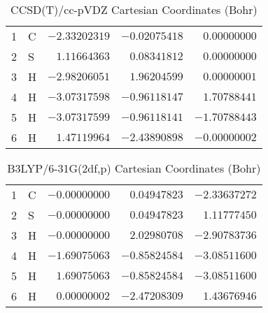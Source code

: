 \documentclass[10pt,oneside]{article}
\begin{document}
\begin{table}[h!]
\centering
\caption{CCSD(T)/cc-pVDZ Cartesian Coordinates (Bohr)}
\begin{tabular}{llrrr}
1  & C  & $-2.33202319$ & $-0.02075418$ & $ 0.00000000$ \\
2  & S  & $ 1.11664363$ & $ 0.08341812$ & $ 0.00000000$ \\
3  & H  & $-2.98206051$ & $ 1.96204599$ & $ 0.00000001$ \\
4  & H  & $-3.07317598$ & $-0.96118147$ & $ 1.70788441$ \\
5  & H  & $-3.07317599$ & $-0.96118141$ & $-1.70788443$ \\
6  & H  & $ 1.47119964$ & $-2.43890898$ & $-0.00000002$ \\
\end{tabular}
\end{table}

\begin{table}[h!]
\centering
\caption{B3LYP/6-31G(2df,p) Cartesian Coordinates (Bohr)}
\begin{tabular}{llrrr}
1  & C  & $-0.00000000$ & $ 0.04947823$ & $-2.33637272$ \\
2  & S  & $-0.00000000$ & $ 0.04947823$ & $ 1.11777450$ \\
3  & H  & $-0.00000000$ & $ 2.02980708$ & $-2.90783736$ \\
4  & H  & $-1.69075063$ & $-0.85824584$ & $-3.08511600$ \\
5  & H  & $ 1.69075063$ & $-0.85824584$ & $-3.08511600$ \\
6  & H  & $ 0.00000002$ & $-2.47208309$ & $ 1.43676946$ \\
\end{tabular}
\end{table}

\clearpage
\end{document}
